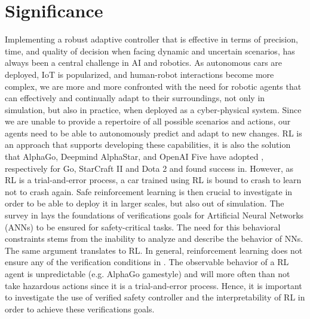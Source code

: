 \documentclass[a4paper,11pt]{article}
\begin{document}
\section{Significance}
Implementing a robust adaptive controller that is effective in terms of precision, time, and quality of decision
when facing dynamic and uncertain scenarios, has always been a central challenge in AI and robotics.
As autonomous cars are deployed, IoT is popularized, and human-robot interactions become more complex, we
are more and more confronted with the need for robotic agents that can effectively and continually adapt
to their surroundings, not only in simulation, but also in practice, when deployed as a cyber-physical system. 
Since we are unable to provide a repertoire of all possible scenarios and actions,
our agents need to be able to autonomously predict and adapt to new changes. RL is an approach that
supports developing these capabilities, it is also the solution that AlphaGo, Deepmind AlphaStar, and OpenAI Five have
adopted \cite{li2019reinforcement}, respectively for Go, StarCraft II and Dota 2 and found success in. 
However, as RL is a trial-and-error process, a car trained using RL is bound to crash to learn not to crash again. Safe reinforcement learning is then crucial 
to investigate in order to be able to deploy it in larger scales, but also out of simulation. 
The survey in \cite{kurdkelly2003} lays the foundations of verifications goals for Artificial Neural Networks (ANNs) to be ensured for safety-critical tasks. The need for this behavioral constraints stems from the inability to analyze and 
describe the behavior of NNs. The same argument translates to RL. In general, reinforcement learning does not ensure any of the verification conditions in \cite{kurdkelly2003}. 
The observable behavior of a RL agent is unpredictable (e.g. AlphaGo gamestyle) and will more often than not take hazardous actions since it is a trial-and-error process. Hence, it is important to investigate
the use of verified safety controller and the interpretability of RL in order to achieve these verifications goals.  
\end{document}
